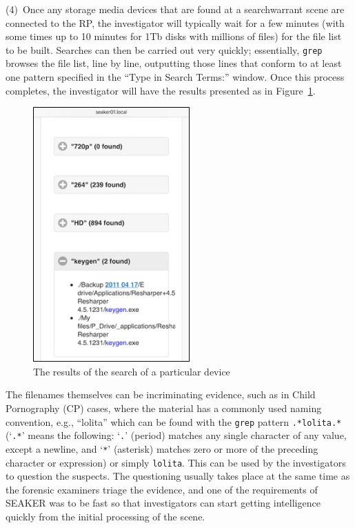 \documentclass[12pt]{article}
\begin{document}
(4)~Once any storage media devices that are found at a \gls{searchwarrant} scene
are connected to the RP, the investigator will typically wait for a
few minutes (with some times up to 10 minutes for 1Tb disks with
millions of files) for the file list to be built. Searches can then
be carried out very quickly; essentially, \verb|grep| browses the file
list, line by line, outputting those lines that conform to at least
one pattern specified in the ``Type in Search Terms:'' window. Once
this process completes, the investigator will have the results presented as in
Figure~\ref{fig:screen-3}.

\begin{figure}[H]
  \begin{center}
  \includegraphics[width=6cm]{images/seaker-hh-screen-3.jpg}
  \caption{The results of the search of a particular device}
  \label{fig:screen-3}
  \end{center}
\end{figure}

The filenames themselves can be incriminating evidence, such as in
Child Pornography (CP) cases, where the material has a commonly used
naming convention, e.g., ``lolita'' which can be found with the \verb|grep|
pattern \verb|.*lolita.*| (`\verb|.*|' means the
following: `\verb|.|' (period)  matches any single character of any
value, except
a newline, and `\verb|*|' (asterisk) matches zero or more of the
preceding character or expression) or simply \verb|lolita|.
This can be used by the
investigators to question the suspects.  The questioning usually
takes place at the same time as the forensic examiners triage the
evidence, and one of the requirements of SEAKER was to be fast so that
investigators can start getting intelligence quickly from the initial
processing of the scene.\\
\end{document}

